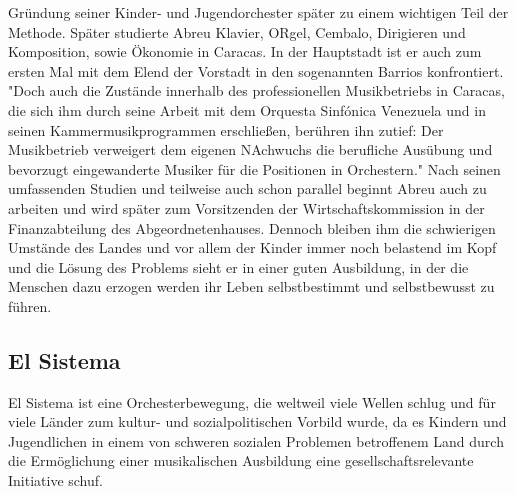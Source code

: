 Gründung seiner Kinder- und Jugendorchester später zu einem wichtigen Teil der
Methode. Später studierte Abreu Klavier, ORgel, Cembalo, Dirigieren und
Komposition, sowie Ökonomie in Caracas. In der Hauptstadt ist er auch zum ersten
Mal mit dem Elend der Vorstadt in den sogenannten Barrios konfrontiert. "Doch
auch die Zustände innerhalb des professionellen Musikbetriebs in Caracas, die
sich ihm durch seine Arbeit mit dem Orquesta Sinfónica Venezuela und in seinen
Kammermusikprogrammen erschließen, berühren ihn zutief: Der Musikbetrieb
verweigert dem eigenen NAchwuchs die berufliche Ausübung und bevorzugt
eingewanderte Musiker für die Positionen in
Orchestern."\autocite[28]{kaufmann:el_sistema} Nach seinen umfassenden Studien
und teilweise auch schon parallel beginnt Abreu auch zu arbeiten und wird später
zum Vorsitzenden der Wirtschaftskommission in der Finanzabteilung des
Abgeordnetenhauses. Dennoch bleiben ihm die schwierigen Umstände des Landes und
vor allem der Kinder immer noch belastend im Kopf und die Lösung des Problems
sieht er in einer guten Ausbildung, in der die Menschen dazu erzogen werden ihr
Leben selbstbestimmt und selbstbewusst zu
führen.\autocite[31]{kaufmann:el_sistema} 



\subsection{El Sistema}
El Sistema ist eine Orchesterbewegung, die weltweil viele Wellen schlug und für
viele Länder zum kultur- und sozialpolitischen Vorbild wurde, da es Kindern und
Jugendlichen in einem von schweren sozialen Problemen betroffenem Land durch die
Ermöglichung einer musikalischen Ausbildung eine gesellschaftsrelevante
Initiative schuf. 

